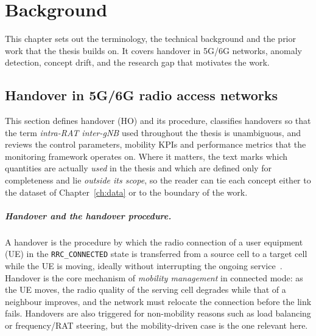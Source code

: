 
\chapter{Background}
\label{ch:background}

This chapter sets out the terminology, the technical background and the prior
work that the thesis builds on. It covers handover in 5G/6G networks, anomaly
detection, concept drift, and the research gap that motivates the work.

\section{Handover in 5G/6G radio access networks}
\label{sec:ho-background}

This section defines handover (HO) and its procedure, classifies handovers so
that the term \emph{intra-RAT inter-gNB} used throughout the thesis is
unambiguous, and reviews the control parameters, mobility KPIs and performance
metrics that the monitoring framework operates on. Where it matters, the text
marks which quantities are actually \emph{used} in the thesis and which are
defined only for completeness and lie \emph{outside its scope}, so the reader can
tie each concept either to the dataset of Chapter~\ref{ch:data} or to the
boundary of the work.

\paragraph{Handover and the handover procedure.}
A handover is the procedure by which the radio connection of a user equipment
(UE) in the \texttt{RRC\_CONNECTED} state is transferred from a source cell to a
target cell while the UE is moving, ideally without interrupting the ongoing
service~\cite{ts38300}. Handover is the core mechanism of \emph{mobility
management} in connected mode: as the UE moves, the radio quality of the serving
cell degrades while that of a neighbour improves, and the network must relocate
the connection before the link fails. Handovers are also triggered for
non-mobility reasons such as load balancing or frequency/RAT steering, but the
mobility-driven case is the one relevant here.

